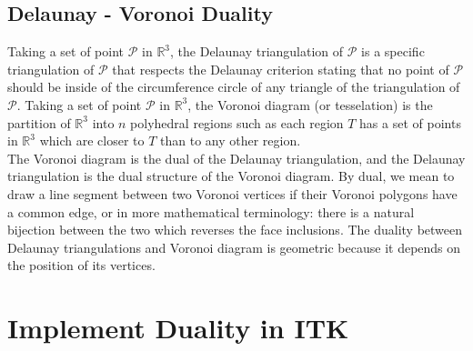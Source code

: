 \documentclass{InsightArticle}
\begin{document}
\subsection{Delaunay - Voronoi Duality}
Taking a set of point $\mathcal{P}$ in $\mathbb{R}^3$, the Delaunay triangulation of $\mathcal{P}$ is a specific triangulation of $\mathcal{P}$ that respects the Delaunay criterion stating that no point of $\mathcal{P}$ should be inside of the circumference circle of any triangle of the triangulation of $\mathcal{P}$. Taking a set of point $\mathcal{P}$ in $\mathbb{R}^3$, the Voronoi diagram (or tesselation) is the partition of $\mathbb{R}^3$  into $n$ polyhedral regions such as each region $T$ has a set of points in $\mathbb{R}^3$ which are closer to $T$ than to any other region.\\
The Voronoi diagram is the dual of the Delaunay triangulation, and the Delaunay triangulation is the dual structure of the Voronoi diagram. By dual, we mean to draw a line segment between two Voronoi vertices if their Voronoi polygons have a common edge, or in more mathematical terminology: there is a natural bijection between the two which reverses the face inclusions. The duality between Delaunay triangulations and Voronoi diagram is geometric because it depends on the position of its vertices.
\section{Implement Duality in ITK}
\end{document}
